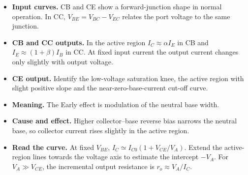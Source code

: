 \documentclass[12pt,a4paper]{article}
\begin{document}
\begin{itemize}[leftmargin=*, itemsep=3pt, topsep=4pt]
  \item \textbf{Input curves.} CB and CE show a forward-junction shape in normal operation. In CC, \(V_{BE}=V_{BC}-V_{EC}\) relates the port voltage to the same junction.
  \item \textbf{CB and CC outputs.} In the active region \(I_C\approx\alpha I_E\) in CB and \(I_E\approx(1+\beta)I_B\) in CC. At fixed input current the output current changes only slightly with output voltage.
  \item \textbf{CE output.} Identify the low-voltage saturation knee, the active region with slight positive slope and the near-zero-base-current cut-off curve.
\end{itemize}

\begin{tcolorbox}[tikzbox,title={CE output characteristics and the Early effect},unbreakable]
\centering
{}
\end{tcolorbox}

\begin{itemize}[leftmargin=*, itemsep=3pt, topsep=4pt]
  \item \textbf{Meaning.} The Early effect is modulation of the neutral base width.
  \item \textbf{Cause and effect.} Higher collector--base reverse bias narrows the neutral base, so collector current rises slightly in the active region.
  \item \textbf{Read the curve.} At fixed \(V_{BE}\), \(I_C\simeq I_{C0}(1+V_{CE}/V_A)\). Extend the active-region lines towards the voltage axis to estimate the intercept \(-V_A\). For \(V_A\gg V_{CE}\), the incremental output resistance is \(r_o\approx V_A/I_C\).
\end{itemize}
\end{document}
